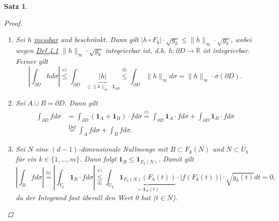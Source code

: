 \documentclass[a4paper]{scrreprt}
\newcommand{\doubleOne}{\textbf{1}}
\newcommand{\R}{\mathbb{R}}
\newcommand{\Rq}{\overline{\R}}
\newcommand{\dcup}{\dot{\cup}}
\newcommand{\overunderset}[3]{\overset{#1}{\underset{#3}{#2}}}
\newcommand{\jlabel}[1]{\label{j_#1}}
\newcommand{\jhyperref}[2]{\hyperref[j_#1]{#2}}
\newcommand{\jlink}[1]{\jhyperref{#1}{#1}}
\newcommand{\jabb}[3]{ #1: #2 \rightarrow #3 }
\newcommand{\jspacesmall}{\vspace{4pt}}
\newcommand{\jdate}[1]{\jspacesmall\begin{center}\jlabel{#1}\tiny{Ana III, #1}\end{center}}
\theoremstyle{plain}
\newtheorem{satz}[thm]{Satz}
\theoremstyle{definition}
\begin{document}
{{{{\begin{satz}
\begin{proof}
\begin{enumerate}
\jdate{19.01.2009}

            \item
                Sei $h$ \jlink{messbar} und beschränkt. Dann gilt $|h\circ F_k|\cdot \sqrt{g_k} \le \lVert h \rVert_\infty \cdot \sqrt{g_k}$, wobei wegen \jlink{Def 4.1} $\lVert h \rVert_\infty \cdot \sqrt{g_k}$ integrierbar ist, d.h. $\jabb{h}{\partial D}{\Rq}$ ist integrierbar. Ferner gilt
                \[
                    \left| \int_{\partial D} h d\sigma \right| \overset{\text{e)}}{\le} \int_{\partial D} \underbrace{|h|}_{\le \lVert h \rVert_\infty \cdot \doubleOne_{\partial D}} \overset{\text{d)}}{\le} \int_{\partial D} \lVert h \rVert_\infty d \sigma = \lVert h \rVert_\infty \cdot \sigma(\partial D).
                \]
                
            \item
                Sei $A \dcup B = \partial D$. Dann gilt
                \[
                    \begin{split}
                        \int_{\partial D} f d \sigma &= \int_{\partial D} \left( \doubleOne_A + \doubleOne_B \right)\cdot f d \sigma \overset{\text{c)}}{=} \int_{\partial D} \doubleOne_A \cdot f d\sigma + \int_{\partial D} \doubleOne_B \cdot f d\sigma\\
                        &\overset{\text{Def}}{=} \int_A f d\sigma + \int_B f d\sigma.
                    \end{split}
                \]

            \item
                Sei $N$ eine $(d-1)$-dimensionale Nullmenge mit $B\subset F_k(N)$ und $N\subset U_k$ für ein $k\in \{1,\dots,m\}$. Dann folgt $\doubleOne_B \le \doubleOne_{F_k(N)}$. Damit gilt
                \[
                    \left| \int_B f d\sigma \right| \overset{\text{b)}}{=} \left|\int_{V_k} \doubleOne_B\cdot f d\sigma \right| \overunderset{\text{e)}}{\le}{\text{d)}} \int_{U_k} \underbrace{\doubleOne_{F_k(N)}(F_k(t))}_{=\doubleOne_N(t)} \cdot |f(F_k(t))|\cdot \sqrt{g_k(t)} dt = 0,
                \]
                da der Integrand fast überall den Wert 0 hat ($t\in N$).
                

\end{enumerate}
\end{proof}
\end{satz}}}}}
\end{document}
